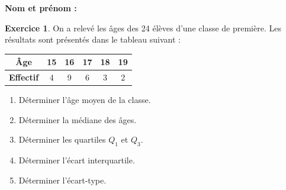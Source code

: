 \documentclass{article}
\theoremstyle{definition}
\newtheorem{exercice}{Exercice}
\begin{document}
\pagestyle{fancy}

\fancyhf{} %
\fancyhead[L]{\large \textbf{\Niveau}}
\fancyhead[C]{\large \textbf{\Chapitre}}

\large

\textbf{Nom et prénom :}\enspace\dotfill

\vfill

\begin{exercice}
  On a relevé les âges des 24 élèves d’une classe de première. Les résultats sont présentés dans le tableau suivant :

  \begin{center}
    \renewcommand{\arraystretch}{1.5}
    \begin{tabular}{|c|c|c|c|c|c|}
      \hline
      \textbf{Âge}        & 15 & 16 & 17 & 18 & 19 \\
      \hline
      \textbf{Effectif}   &  4 & 9 &  6 &  3 &  2 \\
      \hline
    \end{tabular}
  \end{center}

  \begin{enumerate}
    \item Déterminer l’âge moyen de la classe.
    \item Déterminer la médiane des âges.
    \item Déterminer les quartiles $Q_1$ et $Q_3$.
    \item Déterminer l’écart interquartile.
    \item Déterminer l’écart-type.
  \end{enumerate}
\end{exercice}

\vfill
\end{document}
